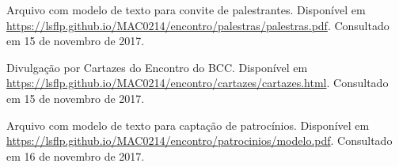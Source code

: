 \documentclass[12pt,letterpaper]{article}
\begin{document}
	\begin{thebibliography}{1}
		
		Arquivo com modelo de texto para convite de palestrantes.
		\newblock Disponível em \url{https://lsflp.github.io/MAC0214/encontro/palestras/palestras.pdf}.
		\newblock Consultado em 15 de novembro de 2017.
		
		Divulgação por Cartazes do Encontro do BCC.
		\newblock Disponível em \url{https://lsflp.github.io/MAC0214/encontro/cartazes/cartazes.html}.
		\newblock Consultado em 15 de novembro de 2017.
		
		Arquivo com modelo de texto para captação de patrocínios.
		\newblock Disponível em \url{https://lsflp.github.io/MAC0214/encontro/patrocinios/modelo.pdf}.
		\newblock Consultado em 16 de novembro de 2017.
		
	\end{thebibliography}
	
			 
\end{document}
